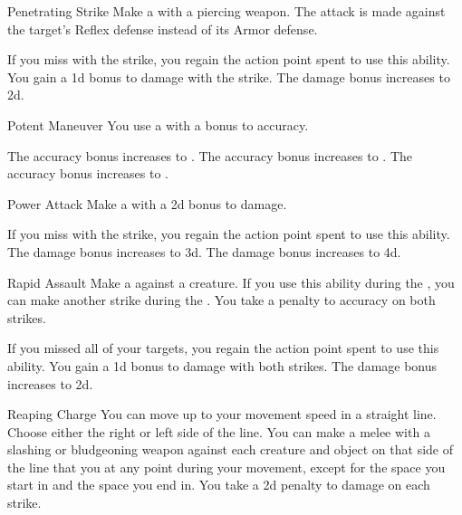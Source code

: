 {            \begin{ability}{Penetrating Strike}
                Make a  with a piercing weapon.
                The attack is made against the target's Reflex defense instead of its Armor defense.

                \rankline
                 If you miss with the strike, you regain the action point spent to use this ability.
                 You gain a \plus1d bonus to damage with the strike.
                 The damage bonus increases to \plus2d.
            \end{ability}

            \begin{ability}{Potent Maneuver}
                You use a  with a  bonus to accuracy.

                \rankline
                 The accuracy bonus increases to .
                 The accuracy bonus increases to .
                 The accuracy bonus increases to .
            \end{ability}

            \begin{ability}{Power Attack}
                Make a  with a \plus2d bonus to damage.

                \rankline
                 If you miss with the strike, you regain the action point spent to use this ability.
                 The damage bonus increases to \plus3d.
                 The damage bonus increases to \plus4d.
            \end{ability}

            \begin{ability}{Rapid Assault}
                Make a  against a creature.
                If you use this ability during the , you can make another strike during the .
                You take a  penalty to accuracy on both strikes.

                \rankline
                 If you missed all of your targets, you regain the action point spent to use this ability.
                 You gain a \plus1d bonus to damage with both strikes.
                 The damage bonus increases to \plus2d.
            \end{ability}

            \begin{ability}{Reaping Charge}
                You can move up to your movement speed in a straight line.
                Choose either the right or left side of the line.
                You can make a melee  with a slashing or bludgeoning weapon against each creature and object on that side of the line that you  at any point during your movement, except for the space you start in and the space you end in.
                You take a \minus2d penalty to damage on each strike.


\end{ability}}
